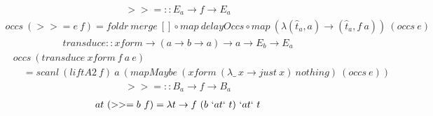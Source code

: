 \documentclass[fleqn]{amsart}
\begin{document}
\begin{align*}
  >>= :: E_a \rightarrow f \rightarrow E_a
\end{align*}
\begin{align*}
  occs\ (>>= e\ f) = foldr\ merge\ []\circ map\ delayOccs\circ map\ (\lambda(\hat{t}_a, a) \rightarrow (\hat{t}_a , f\ a))\ (occs\ e)
\end{align*}
\begin{align*}
  transduce :: xform \rightarrow (a \rightarrow b \rightarrow a) \rightarrow a \rightarrow E_b \rightarrow E_a
\end{align*}
\begin{align*}
  &occs\ (transduce\ xform\ f\ a\ e)\\
  &\quad= scanl\ (liftA2\ f)\ a\ (mapMaybe\ (xform\ (\lambda\_\ x\rightarrow just\ x)\ nothing)\ (occs\ e))
\end{align*}
\begin{align*}
  >>= :: B_a \rightarrow f \rightarrow B_a
\end{align*}
\begin{align*}
  at\ (>>= b\ f) =\lambda t \rightarrow f\ (b\ `at` \ t)\ `at` \ t
\end{align*}
\end{document}
